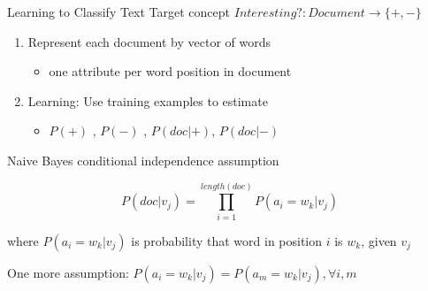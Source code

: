 \documentclass[%
pdf,
colorBG,
slideColor,
tcrico,
]{prosper}
\begin{document}
\begin{slide}{Learning to Classify Text   }  
\tiny
Target concept $Interesting? : Document \to \{+,-\}$

\begin{enumerate}
\item Represent each document by vector of words
\begin{itemize}
\item one attribute per word position in document
\end{itemize}
\item Learning: Use training examples to estimate
\begin{itemize}
\item $P(+)$ , $P(-)$ , $P(doc|+)$, $P(doc|-)$
\end{itemize}
\end{enumerate}
Naive Bayes conditional independence assumption

\[ P(doc|v_j) = \prod_{i=1}^{length(doc)} P(a_i=w_k | v_j) \]

where $P(a_i=w_k| v_j)$ is probability that word in position $i$ is $w_k$,
given $v_j$

One more assumption: $P(a_i=w_k|v_j) = P(a_m=w_k|v_j), \forall i,m$

\end{slide}

\end{document}
